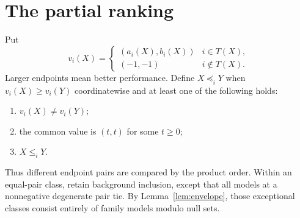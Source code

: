 \documentclass[11pt]{article}
\theoremstyle{remark}
\begin{document}
\section{The partial ranking}

Put
\[
 v_i(X)=
 \begin{cases}(a_i(X),b_i(X))&i\in T(X),\\(-1,-1)&i\notin T(X).
 \end{cases}
\]
Larger endpoints mean better performance. Define $X\preceq_iY$ when
$v_i(X)\ge v_i(Y)$ coordinatewise and at least one of the following holds:
\begin{enumerate}[label=(\roman*)]
\item $v_i(X)\ne v_i(Y)$;
\item the common value is $(t,t)$ for some $t\ge0$;
\item $X\le_iY$.
\end{enumerate}
Thus different endpoint pairs are compared by the product order. Within an
equal-pair class, retain background inclusion, except that all models at a
nonnegative degenerate pair tie. By Lemma~\ref{lem:envelope}, those exceptional
classes consist entirely of family models modulo null sets.
\end{document}
